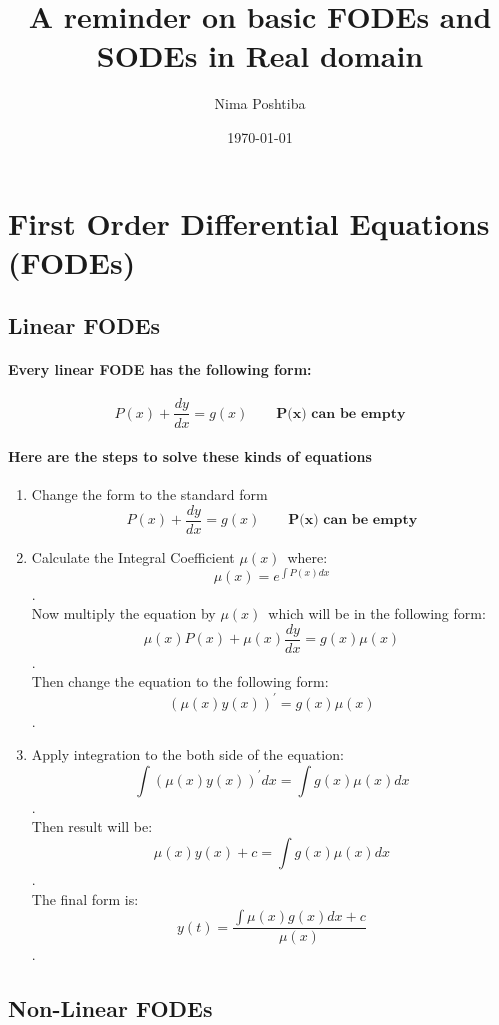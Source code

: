 \documentclass{article}
\author{Nima Poshtiba}
\date{\today}
\title{A reminder on basic FODEs and SODEs in Real domain}
\begin{document}
\maketitle
\tableofcontents
\section{First Order Differential Equations (FODEs)}
\subsection{Linear FODEs}
\paragraph{Every linear FODE has the following form:}
\[
	P(x)+\frac{dy}{dx}=g(x) \qquad \textbf{P(x) can be empty}
\]
\paragraph{Here are the steps to solve these kinds of equations}
\begin{enumerate}
	\item Change the form to the standard form \[	P(x)+\frac{dy}{dx}=g(x) \qquad \textbf{P(x) can be empty}\]\vspace{2em}
	\item Calculate the Integral Coefficient $\mu(x)$\, where: \[\mu(x)=e^{\int{P(x)dx}}\].\\ \vspace{2em}
	Now multiply the equation by $\mu(x)\,$
	which will be in the following form: \[\mu(x)P(x)+\mu(x)\frac{dy}{dx}=g(x)\mu(x)\].\\
	Then change the equation to the following form: \[(\mu(x)y(x))^{'}=g(x)\mu(x)\].\\ \vspace{2em}
	\item Apply integration to the both side of the equation: \[\int{(\mu(x)y(x))^{'}dx}=\int{g(x)\mu(x)dx}\].\\
	Then result will be: \[\mu(x)y(x)+c=\int{g(x)\mu(x)dx}\].\\
	The final form is: \[y(t) = \frac{\int{\mu(x)g(x)dx}+c}{\mu(x)} \].\\ \vspace{2em}
\end{enumerate}
\subsection{Non-Linear FODEs}
\end{document}
